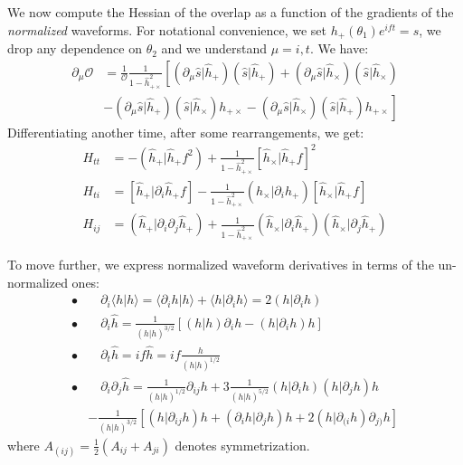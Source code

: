 \documentclass[twocolumn,showpacs,preprintnumbers,nofootinbib,prd,
superscriptaddress,10pt]{revtex4-2}
\newcommand{\scalar}[2]{\langle #1|#2 \rangle}
\newcommand{\rescalar}[2]{( #1 |#2 )}
\newcommand{\imscalar}[2]{[ #1|#2 ]}
\begin{document}
We now compute the Hessian of the overlap as a function of the gradients of the {\it normalized} waveforms. For notational convenience, we set $h_+(\theta_1)e^{ift} = s$, we drop any dependence on $\theta_2$ and we understand $\mu = {i, t}$.
We have:
\begin{align}\label{eq:overlap_grads}
	\partial_{\mu} \mathcal{O} &= \frac{1}{\mathcal{O}} \frac{1}{1-\hat{h}^2_{+\times}}
	\left[
	\rescalar{\partial_\mu\hat{s}}{\hat{h}_+}\rescalar{\hat{s}}{\hat{h}_+} 
	+ \rescalar{\partial_\mu\hat{s}}{\hat{h}_\times}\rescalar{\hat{s}}{\hat{h}_\times} \right. \nonumber \\
	&\left. - \rescalar{\partial_\mu\hat{s}}{\hat{h}_+}\rescalar{\hat{s}}{\hat{h}_\times}h_{+\times}
	- \rescalar{\partial_\mu\hat{s}}{\hat{h}_\times}\rescalar{\hat{s}}{\hat{h}_+}h_{+\times}
	\right]
\end{align}
Differentiating another time, after some rearrangements, we get:
\begin{align}
H_{tt} &= - \rescalar{\hat{h}_+}{\hat{h}_+f^2}
			+ \frac{1}{1-\hat{h}^2_{+\times}} \imscalar{\hat{h}_\times}{\hat{h}_+f}^2 \label{eq:H_tt}\\
H_{ti} &= \imscalar{\hat{h}_+}{\partial_i \hat{h}_+f}
			- \frac{1}{1-\hat{h}^2_{+\times}} \rescalar{\hat{h}_\times}{\partial_i\hat{h}_+} \imscalar{\hat{h}_\times}{\hat{h}_+f} \label{eq:H_ti}\\
H_{ij} &= \rescalar{\hat{h}_+}{\partial_i\partial_j\hat{h}_+}
			+ \frac{1}{1-\hat{h}^2_{+\times}} \rescalar{\hat{h}_\times}{\partial_i\hat{h}_+} \rescalar{\hat{h}_\times}{\partial_j\hat{h}_+} \label{eq:H_ij}
\end{align}

To move further, we express normalized waveform derivatives in terms of the un-normalized ones:
\begin{align*}
	\bullet&\quad \partial_i \scalar{h}{h} = \scalar{\partial_i h}{h}+ \scalar{h}{\partial_i h} = 2 \rescalar{h}{\partial_i h} \\
	\bullet&\quad \partial_i \hat{h} =\frac{1}{\rescalar{h}{h}^{3/2}} \left[ \rescalar{h}{h}\partial_i h -  \rescalar{h}{\partial_i h} h \right]
	\\
	\bullet &\quad \partial_t \hat{h} = i f \hat{h} = i f \frac{h}{\rescalar{h}{h}^{1/2}} \\
	\bullet &\quad \partial_i \partial_j \hat{h} = \frac{1}{\rescalar{h}{h}^{1/2}} \partial_{ij}h 	+3 \frac{1}{\rescalar{h}{h}^{5/2}} \rescalar{h}{\partial_i h}\rescalar{h}{\partial_j h}h \\
	&- \frac{1}{\rescalar{h}{h}^{3/2}} \left[\rescalar{h}{ \partial_{ij} h} h + \rescalar{\partial_i h}{\partial_j h}  h
		+2\rescalar{h}{\partial_{(i} h} \partial_{j)} h \right]
\end{align*}
where $A_{(ij)} = \frac{1}{2}(A_{ij}+A_{ji})$ denotes symmetrization.
\end{document}
